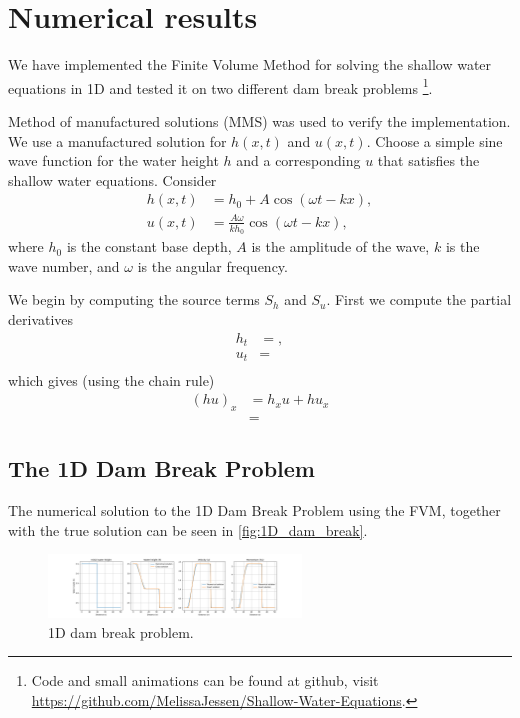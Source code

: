 \chapter{Numerical results}
We have implemented the Finite Volume Method for solving the shallow water equations in 1D and tested it on two different dam break problems
\footnote{Code and small animations can be found at github, visit \url{https://github.com/MelissaJessen/Shallow-Water-Equations}.}.

Method of manufactured solutions (MMS) was used to verify the implementation.
We use a manufactured solution for $h(x,t)$ and $u(x,t)$.
Choose a simple sine wave function for the water height $h$ and a corresponding $u$ that satisfies the shallow water equations.
Consider
\begin{align*}
    h(x,t) &= h_0 + A \cos(\omega t - kx), \\
    u(x,t) &= \frac{ A \omega }{k h_0}  \cos(\omega t - kx),
\end{align*} 
where $h_0$ is the constant base depth, $A$ is the amplitude of the wave, $k$ is the wave number, and $\omega$ is the angular frequency.

We begin by computing the source terms $S_h$ and $S_u$.
First we compute the partial derivatives
\begin{align*}
    h_t &= ,\\
    u_t &=  \\
\end{align*}
which gives (using the chain rule)
\begin{align*}
    {(hu)}_x &= h_x u + h u_x \\
    &= 
\end{align*}

\section{The 1D Dam Break Problem}
The numerical solution to the 1D Dam Break Problem using the FVM, together with the true solution can be seen in \autoref{fig:1D_dam_break}.

\begin{figure}[H]
    \centering
    \includegraphics[width=0.6\textwidth]{plots/sol_1D_val.png}
    \caption{1D dam break problem.}\label{fig:1D_dam_break}
\end{figure}


